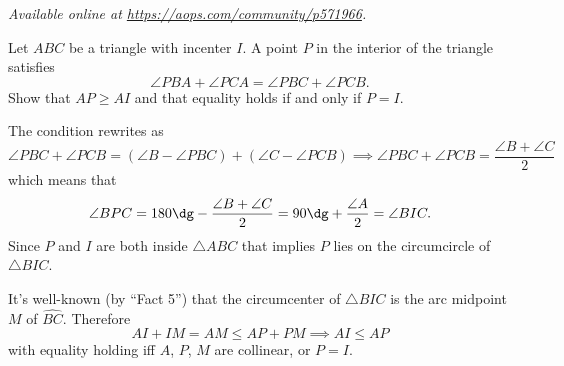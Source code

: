 \textsl{Available online at \url{https://aops.com/community/p571966}.}
\begin{mdframed}[style=mdpurplebox,frametitle={Problem statement}]
Let $ABC$ be a triangle with incenter $I$.
A point $P$ in the interior of the triangle satisfies
\[ \angle PBA + \angle PCA = \angle PBC + \angle PCB. \]
Show that $AP \ge AI$ and that equality holds if and only if $P=I$.
\end{mdframed}
The condition rewrites as
\[
  \angle PBC + \angle PCB
  = (\angle B - \angle PBC)
  + (\angle C - \angle PCB)
  \implies
  \angle PBC + \angle PCB = \frac{\angle B + \angle C}{2}
\]
which means that
\[ \angle BPC = 180\dg - \frac{\angle B + \angle C}{2}
  = 90\dg + \frac{\angle A}{2}
  = \angle BIC.
\]
Since $P$ and $I$ are both inside $\triangle ABC$
that implies $P$ lies on the circumcircle of $\triangle BIC$.

It's well-known (by ``Fact 5'') that the circumcenter
of $\triangle BIC$ is the arc midpoint $M$ of $\widehat{BC}$.
Therefore
\[ AI + IM = AM \le AP + PM \implies AI \le AP \]
with equality holding iff $A$, $P$, $M$ are collinear, or $P=I$.
\pagebreak